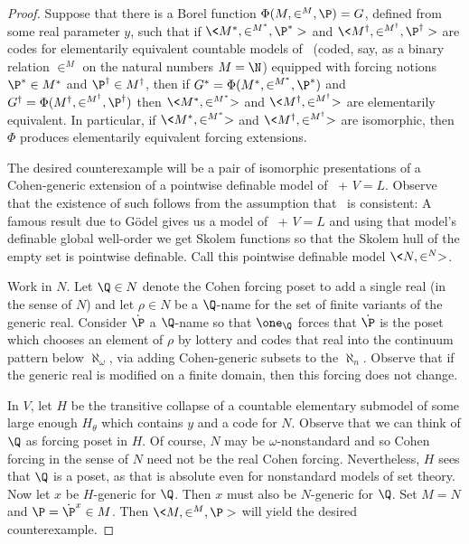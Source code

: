 \documentclass{amsart}
\begin{document}
 \begin{proof}
 Suppose that there is a Borel function $\Phi(M,\in^M,\P)=G$, defined from some real parameter $y$, such that if $\<M^*,\in^{M^*},\P^*>$ and $\<M^\dagger,\in^{M^\dagger},\P^\dagger>$ are codes for elementarily equivalent countable models of \ZF\ (coded, say, as a binary relation $\in^M$ on the natural numbers $M=\N$) equipped with forcing notions $\P^*\in M^*$ and $\P^\dagger \in M^\dagger$, then if $G^* = \Phi(M^*,\in^{M^*},\P^*)$ and $G^\dagger = \Phi(M^\dagger,\in^{M^\dagger},\P^\dagger)$ then $\<M^*,\in^{M^*}>$ and $\<M^\dagger,\in^{M^\dagger}>$ are elementarily equivalent. In particular, if $\<M^*,\in^{M^*}>$ and $\<M^\dagger,\in^{M^\dagger}>$ are isomorphic, then $\Phi$ produces elementarily equivalent forcing extensions.
 
 The desired counterexample will be a pair of isomorphic presentations of a Cohen-generic extension of a pointwise definable model of \ZF\ + $V = L$. Observe that the existence of such follows from the assumption that \ZF\ is consistent: A famous result due to G\"odel gives us a model of \ZF\ + $V = L$ and using that model's definable global well-order we get Skolem functions so that the Skolem hull of the empty set is pointwise definable. Call this pointwise definable model \hbox{$\<N,\in^N>$}.
 
 Work in $N$. Let $\Q \in N$ denote the Cohen forcing poset to add a single real (in the sense of $N$) and let $\rho \in N$ be a $\Q$-name for the set of finite variants of the generic real. Consider $\dot\P$ a $\Q$-name so that $\one_\Q$ forces that $\dot\P$ is the poset which chooses an element of $\rho$ by lottery and codes that real into the continuum pattern below $\aleph_\omega$, via adding Cohen-generic subsets to the $\aleph_n$. Observe that if the generic real is modified on a finite domain, then this forcing does not change.
 
 In $V$, let $H$ be the transitive collapse of a countable elementary submodel of some large enough $H_\theta$ which contains $y$ and a code for $N$. Observe that we can think of $\Q$ as forcing poset in $H$. Of course, $N$ may be $\omega$-nonstandard and so Cohen forcing in the sense of $N$ need not be the real Cohen forcing. Nevertheless, $H$ sees that $\Q$ is a poset, as that is absolute even for nonstandard models of set theory. Now let $x$ be $H$-generic for $\Q$. Then $x$ must also be $N$-generic for $\Q$. Set $M = N$ and $\P = \dot\P^x \in M$. Then $\<M,\in^M,\P>$ will yield the desired counterexample.
 

\end{proof}
\end{document}
